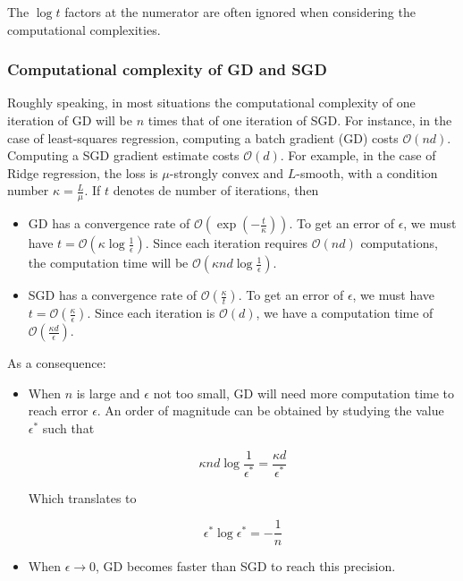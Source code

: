 \documentclass[
10pt, %
a4paper, %
oneside, %
headinclude,footinclude, %
BCOR5mm, %
]{scrartcl}
\begin{document}
\begin{remark}
    The $\log t$ factors at the numerator are often ignored when considering the computational complexities.
\end{remark}

\subsubsection{\large\color{Periwinkle}Computational complexity of GD and SGD}

Roughly speaking, in most situations the computational complexity of one
iteration of GD will be $n$ times that of one iteration of SGD. For instance, in the case of least-squares regression, computing a batch gradient (GD) costs $ \mathcal{O} (nd)$. Computing a SGD gradient estimate costs $ \mathcal{O} (d)$. For example, in the case of Ridge regression, the loss is $\mu$-strongly convex and $L$-smooth, with a condition number $\kappa = \frac{L}{\mu} $. If $t$ denotes de number of iterations, then
\begin{itemize}
    \item GD has a convergence rate of $\mathcal{O} (\exp( - \frac{t}{\kappa} ))$. To get an error of $\epsilon$, we must have $ t= \mathcal{O} ( \kappa \log \frac{1}{\epsilon} )$. Since each iteration requires $ \mathcal{O} (nd)$ computations, the computation time will be $ \mathcal{O} (\kappa nd\log\frac{1}{\epsilon}) $.
    \item SGD has a convergence rate of $ \mathcal{O} ( \frac{\kappa}{t} )$. To get an error of $\epsilon$, we must have $ t = \mathcal{O}( \frac{\kappa}{\epsilon} ) $. Since each iteration is $ \mathcal{O} (d)$, we have a computation time of $ \mathcal{O} ( \frac{\kappa d}{\epsilon} )$.

\end{itemize}

As a consequence:
\begin{itemize}
    \item When $n$ is large and $\epsilon$ not too small, GD will need more computation time to reach error $\epsilon$. An order of magnitude can be obtained by studying the value $\epsilon^*$ such that

	\begin{equation}
	   \kappa nd \log \frac{1}{\epsilon^*}  = \frac{\kappa d}{\epsilon^*} 
	\end{equation}

	Which translates to

	\begin{equation}
	    \epsilon^* \log \epsilon^* = -\frac{1}{n}  
	\end{equation}
    \item When $\epsilon \rightarrow 0$, GD becomes faster than SGD to reach this precision.
\end{itemize}
\end{document}
